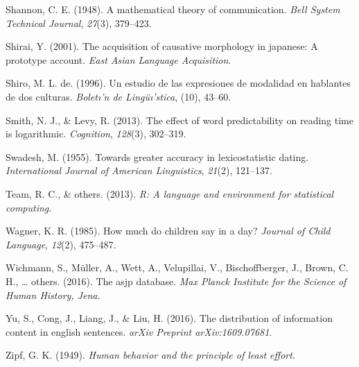 \documentclass[11pt,]{article}
\begin{document}
\leavevmode\hypertarget{ref-shannon1948mathematical}{}%
Shannon, C. E. (1948). A mathematical theory of communication. \emph{Bell System Technical Journal}, \emph{27}(3), 379--423.

\leavevmode\hypertarget{ref-shirai2001acquisition}{}%
Shirai, Y. (2001). The acquisition of causative morphology in japanese: A prototype account. \emph{East Asian Language Acquisition}.

\leavevmode\hypertarget{ref-de1996estudio}{}%
Shiro, M. L. de. (1996). Un estudio de las expresiones de modalidad en hablantes de dos culturas. \emph{Boletı'n de Lingüı'stica}, (10), 43--60.

\leavevmode\hypertarget{ref-smith2013effect}{}%
Smith, N. J., \& Levy, R. (2013). The effect of word predictability on reading time is logarithmic. \emph{Cognition}, \emph{128}(3), 302--319.

\leavevmode\hypertarget{ref-swadesh1955towards}{}%
Swadesh, M. (1955). Towards greater accuracy in lexicostatistic dating. \emph{International Journal of American Linguistics}, \emph{21}(2), 121--137.

\leavevmode\hypertarget{ref-team2013r}{}%
Team, R. C., \& others. (2013). \emph{R: A language and environment for statistical computing}.

\leavevmode\hypertarget{ref-wagner1985much}{}%
Wagner, K. R. (1985). How much do children say in a day? \emph{Journal of Child Language}, \emph{12}(2), 475--487.

\leavevmode\hypertarget{ref-wichmann2016asjp}{}%
Wichmann, S., Müller, A., Wett, A., Velupillai, V., Bischoffberger, J., Brown, C. H., \ldots{} others. (2016). The asjp database. \emph{Max Planck Institute for the Science of Human History, Jena}.

\leavevmode\hypertarget{ref-yu2016distribution}{}%
Yu, S., Cong, J., Liang, J., \& Liu, H. (2016). The distribution of information content in english sentences. \emph{arXiv Preprint arXiv:1609.07681}.

\leavevmode\hypertarget{ref-zipf1949human}{}%
Zipf, G. K. (1949). \emph{Human behavior and the principle of least effort.}
\end{document}
